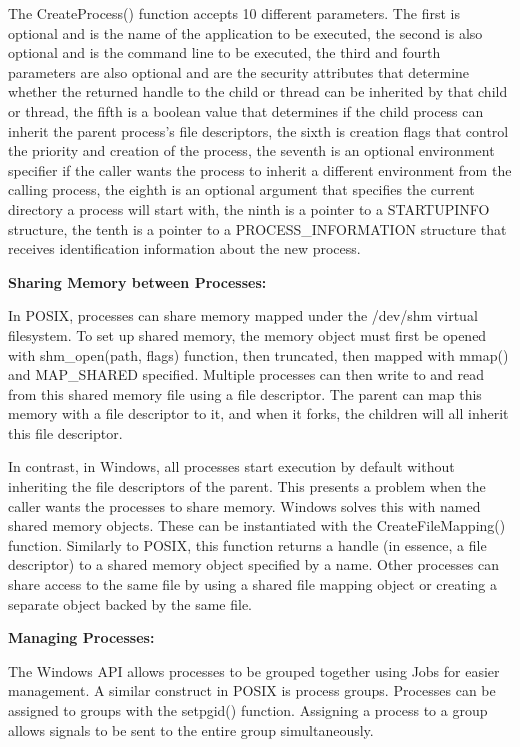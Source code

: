 \documentclass[letterpaper,10pt,titlepage]{article}
\newcommand{\tab}{\hspace*{2em}} %
\begin{document}
\begin{enumerate}
\tab The CreateProcess() function accepts 10 different parameters. The first is optional and is the name of the application to be executed, the second is also optional and is the command line to be executed, the third and fourth parameters are also optional and are the security attributes that determine whether the returned handle to the child or thread can be inherited by that child or thread, the fifth is a boolean value that determines if the child process can inherit the parent process's file descriptors, the sixth is creation flags that control the priority and creation of the process, the seventh is an optional environment specifier if the caller wants the process to inherit a different environment from the calling process, the eighth is an optional argument that specifies the current directory a process will start with, the ninth is a pointer to a STARTUPINFO structure, the tenth is a pointer to a PROCESS\_INFORMATION structure that receives identification information about the new process. \newline

\textbf{Sharing Memory between Processes:} \newline


\tab In POSIX, processes can share memory mapped under the /dev/shm virtual filesystem. To set up shared memory, the memory object must first be opened with shm\_open(path, flags) function, then truncated, then mapped with mmap() and MAP\_SHARED specified. Multiple processes can then write to and read from this shared memory file using a file descriptor. The parent can map this memory with a file descriptor to it, and when it forks, the children will all inherit this file descriptor. \newline

\tab In contrast, in Windows, all processes start execution by default without inheriting the file descriptors of the parent. This presents a problem when the caller wants the processes to share memory. Windows solves this with named shared memory objects. These can be instantiated with the CreateFileMapping() function. Similarly to POSIX, this function returns a handle (in essence, a file descriptor) to a shared memory object specified by a name. Other processes can share access to the same file by using a shared file mapping object or creating a separate object backed by the same file. \newline %

\textbf{Managing Processes:} \newline

The Windows API allows processes to be grouped together using Jobs for easier management. A similar construct in POSIX is process groups. Processes can be assigned to groups with the setpgid() function. Assigning a process to a group allows signals to be sent to the entire group simultaneously.


\end{enumerate}

%
\end{document}
